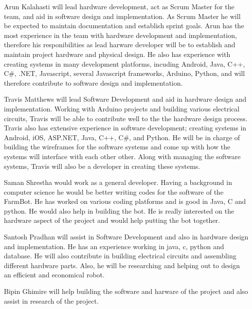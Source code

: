 Arun Kalahasti will lead hardware development, act as Scrum Master for the team, and aid in software design and implementation. As Scrum Master he will be expected to maintain documentation and establish sprint goals. Arun has the most experience in the team with hardware development and implementation, therefore his responibilities as lead harware developer will be to establish and maintain project hardware and physical design. He also has experience with creating systems in many development platforms, incuding Android, Java, C++, C\#, .NET, Javascript, several Javascript frameworks, Arduino, Python, and will therefore contribute to software design and implementation.

Travis Matthews will lead Software Development and aid in hardware design and implementation. Working with Arduino projects and building various electrical circuits, Travis will be able to contribute well to the the hardware design process. Travis also has extensive experience in software development; creating systems in Android, iOS, ASP.NET, Java, C++, C\#, and Python. He will be in charge of building the wireframes for the software systems and come up with how the systems will interface with each other other. Along with managing the software systems, Travis will also be a developer in creating these systems.

Saman Shrestha would work as a general developer. Having a background in computer science he would be better writing codes for the software of the FarmBot. He has worked on various coding platforms and is good in Java, C and python. He would also help in building the bot. He is really interested on the hardware aspect of the project and would help putting the bot together.

Santosh Pradhan will assist in Software Development and also in hardware design and implementation. He has an experience working in java, c, python and database. He will also contribute in building electrical circuits and assembling different hardware parts. Also, he will be researching and helping out to design an efficient and economical robot. 

Bipin Ghimire will help building the software and harware of the project and also assist in research of the project.
